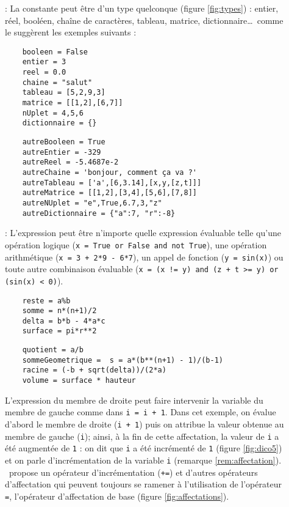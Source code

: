 \begin{description}
\item[] : La constante peut être d'un type quelconque (figure \ref{fig:types}) :
	entier, réel, booléen, chaîne de caractères, tableau, matrice, dictionnaire\ldots\ comme le suggèrent
	les exemples suivants :

	\mbox{}\hfill
	\begin{minipage}[t]{4.5cm}
	\begin{verbatim}
	booleen = False
	entier = 3
	reel = 0.0
	chaine = "salut"
	tableau = [5,2,9,3]
	matrice = [[1,2],[6,7]]
	nUplet = 4,5,6
	dictionnaire = {}
	\end{verbatim}
	\end{minipage}
	\hfill
	\begin{minipage}[t]{9cm}
	\begin{verbatim}
	autreBooleen = True
	autreEntier = -329
	autreReel = -5.4687e-2
	autreChaine = 'bonjour, comment ça va ?'
	autreTableau = ['a',[6,3.14],[x,y,[z,t]]]
	autreMatrice = [[1,2],[3,4],[5,6],[7,8]]
	autreNUplet = "e",True,6.7,3,"z"
	autreDictionnaire = {"a":7, "r":-8}
	\end{verbatim}
	\end{minipage}
	
\item[] : L'expression peut être n'importe quelle expression évaluable
	telle qu'une opération logique ({\tt x = True or False and not True}), une opération
	arithméti\-que ({\tt x = 3 + 2*9 - 6*7}), un appel de fonction ({\tt y = sin(x)}) ou toute 
	autre combinaison évaluable
	({\tt x = (x != y) and (z + t >= y) or (sin(x) < 0)}).

	\mbox{}\hfill
	\begin{minipage}[t]{4cm}
	\begin{verbatim}
	reste = a%b
	somme = n*(n+1)/2
	delta = b*b - 4*a*c
	surface = pi*r**2
	\end{verbatim}
	\end{minipage}
	\hfill
	\begin{minipage}[t]{9.5cm}
	\begin{verbatim}
	quotient = a/b
	sommeGeometrique =  s = a*(b**(n+1) - 1)/(b-1)
	racine = (-b + sqrt(delta))/(2*a)
	volume = surface * hauteur
	\end{verbatim}
	\end{minipage}

	L'expression du membre de droite peut faire intervenir la variable 
	du membre de gauche comme dans {\tt i = i + 1}. Dans cet exemple, on évalue
	d'abord le membre de droite ({\tt i + 1}) puis on attribue la valeur obtenue au
	membre de gauche ({\tt i}); ainsi, à la fin de cette affectation, la valeur de {\tt i}
	a été augmentée de {\tt 1} : on dit que {\tt i} a été incrémenté de {\tt 1}
	(figure \ref{fig:dico5}) et on parle d'incrémentation de la variable {\tt i}
	(remarque \ref{rem:affectation}). \python\ propose un opérateur d'incrémentation ({\tt +=})
	et d'autres opérateurs d'affectation qui peuvent toujours se ramener
	à l'utilisation de l'opérateur {\tt =}, l'opérateur d'affectation de base 
	(figure \ref{fig:affectations}).
\end{description}

